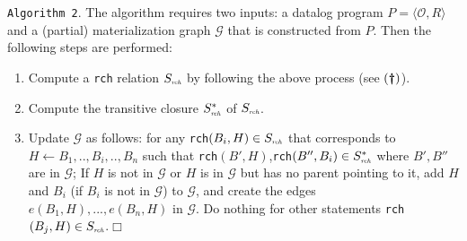 \documentclass{article}
\begin{document}
\noindent\texttt{Algorithm~2}. The algorithm requires two inputs: a datalog program $P=\langle\mathcal{O}, R\rangle$ and a (partial) materialization graph $\mathcal{G}$ that is constructed from $P$. Then the following steps are performed:
\begin{enumerate}[label=(\textbf{\roman*})]
\item Compute a \texttt{rch} relation $S_{\textit{\tiny rch}}$ by following the above process (see $(\textbf{\dag})$).\label{rch}
\item Compute the transitive closure $S^*_{\textit{\tiny rch}}$ of $S_{\textit{\tiny rch}}$.\label{transClos}
\item Update $\mathcal{G}$ as follows: for any \texttt{rch}$(B_i,H)\in S_{\textit{\tiny rch}}$ that corresponds to $H\leftarrow B_1,..,B_i,..,B_n$
such that \texttt{rch}$(B',H)$,\texttt{rch}$(B'',B_i)\in S^*_{\textit{\tiny rch}}$ where $B',B''$ are in $\mathcal{G}$; If $H$ is not in $\mathcal{G}$ or $H$ is in $\mathcal{G}$ but has no parent pointing to it, add $H$ and $B_i$ (if $B_i$ is not in $\mathcal{G}$) to $\mathcal{G}$, and create the edges $e(B_1, H),...,e(B_n, H)$ in $\mathcal{G}$. Do nothing for other statements \texttt{rch}$(B_j,H)\in S_{\textit{\tiny rch}}$.\label{updateG}\hfill$\Box$
\end{enumerate}



\end{document}
